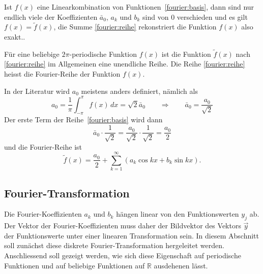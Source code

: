 Ist $f(x)$ eine Linearkombination von Funktionen~\eqref{fourier:basis},
dann sind nur endlich viele der Koeffizienten $\bar{a}_0$, $a_k$ und $b_k$
sind von $0$ verschieden und es gilt $f(x)=\tilde f(x)$, die Summe
\eqref{fourier:reihe} rekonstriert die Funktion $f(x)$ also exakt..

Für eine beliebige $2\pi$-periodische Funktion $f(x)$ ist die Funktion
$\tilde f(x)$ nach \eqref{fourier:reihe} im Allgemeinen eine unendliche
Reihe.
Die Reihe \eqref{fourier:reihe} heisst die Fourier-Reihe der Funktion 
$f(x)$.

In der Literatur wird $a_0$ meistens anders definiert, nämlich als
\[
a_0 = \frac1{\pi}\int_{-\pi}^{\pi} f(x)\,dx = \sqrt{2}\bar{a}_0
\qquad\Rightarrow\qquad
\bar{a}_0 = \frac{a_0}{\sqrt{2}}
\]
Der erste Term der Reihe~\eqref{fourier:basis} wird dann
\[
\bar{a}_0\cdot\frac1{\sqrt{2}}
=
\frac{a_0}{\sqrt{2}}\cdot\frac{1}{\sqrt{2}}
=
\frac{a_0}2
\]
und die Fourier-Reihe ist
\begin{equation}
\tilde f(x)
=
\frac{a_0}2
+
\sum_{k=1}^\infty (a_k\cos kx+b_k\sin kx).
\end{equation}

\subsection{Fourier-Transformation}
Die Fourier-Koeffizienten $a_k$ und $b_k$ hängen linear von den
Funktionswerten $y_j$ ab.
Der Vektor der Fourier-Koeffizienten muss daher der Bildvektor des
Vektors $\vec y$ der Funktionswerte unter einer linearen Transformation
sein.
In diesem Abschnitt soll zunächst diese diskrete Fourier-Transformation 
hergeleitet werden.
Anschliessend soll gezeigt werden, wie sich diese Eigenschaft auf 
periodische Funktionen und auf beliebige Funktionen auf $\mathbb R$
ausdehenen lässt.

